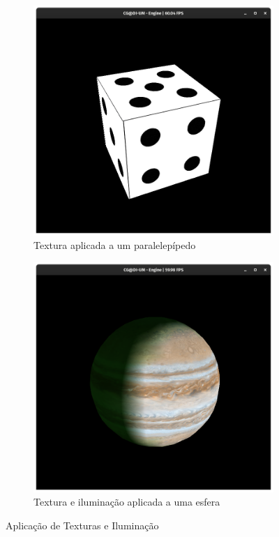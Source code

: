 \documentclass[a4paper, 11pt]{article}
\begin{document}
\begin{figure}[H]
	\centering
	\begin{subfigure}{.5\textwidth}
		\centering
		\includegraphics[width=\textwidth]{img/dart.png}
		\caption{Textura aplicada a um paralelepípedo}
	\end{subfigure}%
	\begin{subfigure}{.5\textwidth}
		\centering
		\includegraphics[width=\textwidth]{img/esfera1.png}
		\caption{Textura e iluminação aplicada a uma esfera}
	\end{subfigure}
	\caption{Aplicação de Texturas e Iluminação}
\end{figure}
\end{document}
